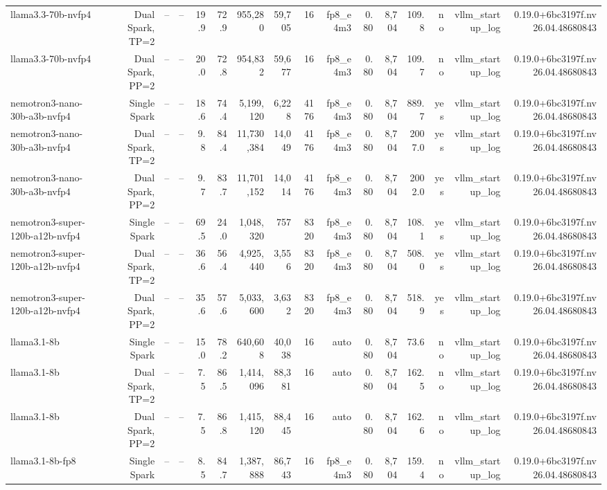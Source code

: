 \begin{tabular}{l r r r r r r r r r r r r r r r }
llama3.3-70b-nvfp4 & Dual Spark, TP=2 & -- & -- & 19.9 & 72.9 & 955,280 & 59,705 & 16 & fp8\_e4m3 & 0.80 & 8,704 & 109.8 & no & vllm\_startup\_log & 0.19.0+6bc3197f.nv26.04.48680843 \\
llama3.3-70b-nvfp4 & Dual Spark, PP=2 & -- & -- & 20.0 & 72.8 & 954,832 & 59,677 & 16 & fp8\_e4m3 & 0.80 & 8,704 & 109.7 & no & vllm\_startup\_log & 0.19.0+6bc3197f.nv26.04.48680843 \\
nemotron3-nano-30b-a3b-nvfp4 & Single Spark & -- & -- & 18.6 & 74.4 & 5,199,120 & 6,228 & 4176 & fp8\_e4m3 & 0.80 & 8,704 & 889.7 & yes & vllm\_startup\_log & 0.19.0+6bc3197f.nv26.04.48680843 \\
nemotron3-nano-30b-a3b-nvfp4 & Dual Spark, TP=2 & -- & -- & 9.8 & 84.4 & 11,730,384 & 14,049 & 4176 & fp8\_e4m3 & 0.80 & 8,704 & 2007.0 & yes & vllm\_startup\_log & 0.19.0+6bc3197f.nv26.04.48680843 \\
nemotron3-nano-30b-a3b-nvfp4 & Dual Spark, PP=2 & -- & -- & 9.7 & 83.7 & 11,701,152 & 14,014 & 4176 & fp8\_e4m3 & 0.80 & 8,704 & 2002.0 & yes & vllm\_startup\_log & 0.19.0+6bc3197f.nv26.04.48680843 \\
nemotron3-super-120b-a12b-nvfp4 & Single Spark & -- & -- & 69.5 & 24.0 & 1,048,320 & 757 & 8320 & fp8\_e4m3 & 0.80 & 8,704 & 108.1 & yes & vllm\_startup\_log & 0.19.0+6bc3197f.nv26.04.48680843 \\
nemotron3-super-120b-a12b-nvfp4 & Dual Spark, TP=2 & -- & -- & 36.6 & 56.4 & 4,925,440 & 3,556 & 8320 & fp8\_e4m3 & 0.80 & 8,704 & 508.0 & yes & vllm\_startup\_log & 0.19.0+6bc3197f.nv26.04.48680843 \\
nemotron3-super-120b-a12b-nvfp4 & Dual Spark, PP=2 & -- & -- & 35.6 & 57.6 & 5,033,600 & 3,632 & 8320 & fp8\_e4m3 & 0.80 & 8,704 & 518.9 & yes & vllm\_startup\_log & 0.19.0+6bc3197f.nv26.04.48680843 \\
llama3.1-8b & Single Spark & -- & -- & 15.0 & 78.2 & 640,608 & 40,038 & 16 & auto & 0.80 & 8,704 & 73.6 & no & vllm\_startup\_log & 0.19.0+6bc3197f.nv26.04.48680843 \\
llama3.1-8b & Dual Spark, TP=2 & -- & -- & 7.5 & 86.5 & 1,414,096 & 88,381 & 16 & auto & 0.80 & 8,704 & 162.5 & no & vllm\_startup\_log & 0.19.0+6bc3197f.nv26.04.48680843 \\
llama3.1-8b & Dual Spark, PP=2 & -- & -- & 7.5 & 86.8 & 1,415,120 & 88,445 & 16 & auto & 0.80 & 8,704 & 162.6 & no & vllm\_startup\_log & 0.19.0+6bc3197f.nv26.04.48680843 \\
llama3.1-8b-fp8 & Single Spark & -- & -- & 8.5 & 84.7 & 1,387,888 & 86,743 & 16 & fp8\_e4m3 & 0.80 & 8,704 & 159.4 & no & vllm\_startup\_log & 0.19.0+6bc3197f.nv26.04.48680843 \\

\end{tabular}
